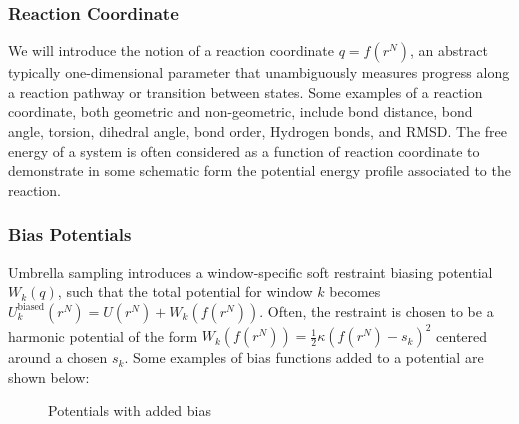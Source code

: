 \documentclass{article}
\begin{document}
\subsubsection{Reaction Coordinate}
We will introduce the notion of a reaction coordinate $q = f(r^N)$, an abstract typically one-dimensional parameter that unambiguously measures progress along a reaction pathway or transition between states.
Some examples of a reaction coordinate, both geometric and non-geometric, include bond distance, bond angle, torsion, dihedral angle, bond order, Hydrogen bonds, and RMSD. 
The free energy of a system is often considered as a function of reaction coordinate to demonstrate in some schematic form the potential energy profile associated to the reaction.

\subsubsection{Bias Potentials}
Umbrella sampling introduces a window-specific soft restraint biasing potential $W_k(q)$, such that the total potential for window $k$ becomes $U_k^\text{biased}(r^N) = U(r^N) + W_k(f(r^N))$.
Often, the restraint is chosen to be a harmonic potential of the form $W_k(f(r^N)) = \frac{1}{2} \kappa (f(r^N) - s_k)^2$ centered around a chosen $s_k$.
Some examples of bias functions added to a potential are shown below:

\begin{figure}[h]%
    \centering
    \qquad
    \caption{Potentials with added bias}%
    \label{fig:bias_pots}%
\end{figure}
\end{document}
